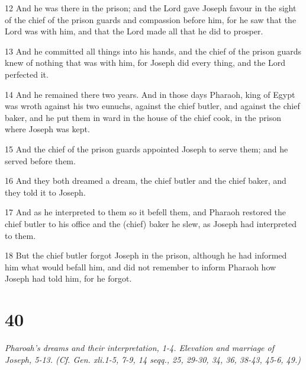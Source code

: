 \par 12 And he was there in the prison; and the Lord gave Joseph favour in the sight of the chief of the prison guards and compassion before him, for he saw that the Lord was with him, and that the Lord made all that he did to prosper.
\par 13 And he committed all things into his hands, and the chief of the prison guards knew of nothing that was with him, for Joseph did every thing, and the Lord perfected it.
\par 14 And he remained there two years. And in those days Pharaoh, king of Egypt was wroth against his two eunuchs, against the chief butler, and against the chief baker, and he put them in ward in the house of the chief cook, in the prison where Joseph was kept.
\par 15 And the chief of the prison guards appointed Joseph to serve them; and he served before them.
\par 16 And they both dreamed a dream, the chief butler and the chief baker, and they told it to Joseph.
\par 17 And as he interpreted to them so it befell them, and Pharaoh restored the chief butler to his office and the (chief) baker he slew, as Joseph had interpreted to them.
\par 18 But the chief butler forgot Joseph in the prison, although he had informed him what would befall him, and did not remember to inform Pharaoh how Joseph had told him, for he forgot.

\chapter{40}

\par \textit{Pharoah's dreams and their interpretation, 1-4. Elevation and marriage of Joseph, 5-13. (Cf. Gen. xli.1-5, 7-9, 14 seqq., 25, 29-30, 34, 36, 38-43, 45-6, 49.)}

